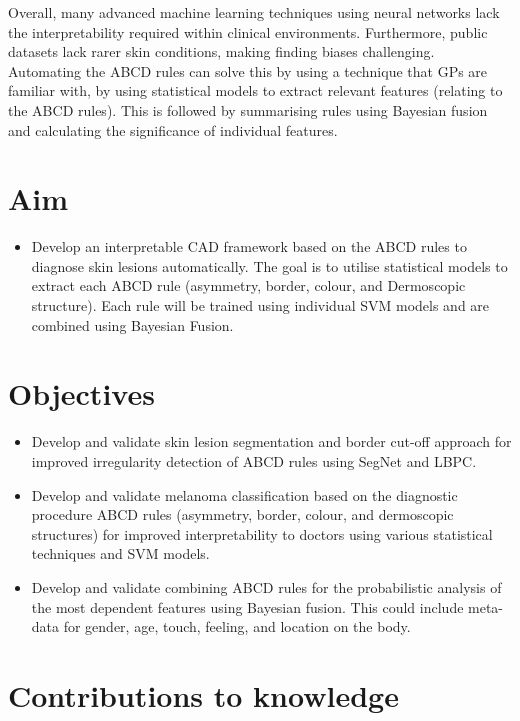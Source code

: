 \documentclass[10.5pt]{report}
\begin{document}
Overall, many advanced machine learning techniques using neural networks lack the interpretability required within clinical environments. Furthermore, public datasets lack rarer skin conditions, making finding biases challenging. Automating the ABCD rules can solve this by using a technique that GPs are familiar with, by using statistical models to extract relevant features (relating to the ABCD rules). This is followed by summarising rules using Bayesian fusion and calculating the significance of individual features.

\section{Aim}
\begin{itemize}
	\item Develop an interpretable CAD framework based on the ABCD rules to diagnose skin lesions automatically. The goal is to utilise statistical models to extract each ABCD rule (asymmetry, border, colour, and Dermoscopic structure). Each rule will be trained using individual SVM models and are combined using Bayesian Fusion.
\end{itemize}

\section{Objectives}
\begin{itemize}

	\item Develop and validate skin lesion segmentation and border cut-off approach for improved irregularity detection of ABCD rules using SegNet and LBPC.
	\item Develop and validate melanoma classification based on the diagnostic procedure ABCD rules (asymmetry, border, colour, and dermoscopic structures) for improved interpretability to doctors using various statistical techniques and SVM models.
	\item Develop and validate combining ABCD rules for the probabilistic analysis of the most dependent features using Bayesian fusion. This could include meta-data for gender, age, touch, feeling, and location on the body.

\end{itemize}

\section{Contributions to knowledge}
 
\end{document}
